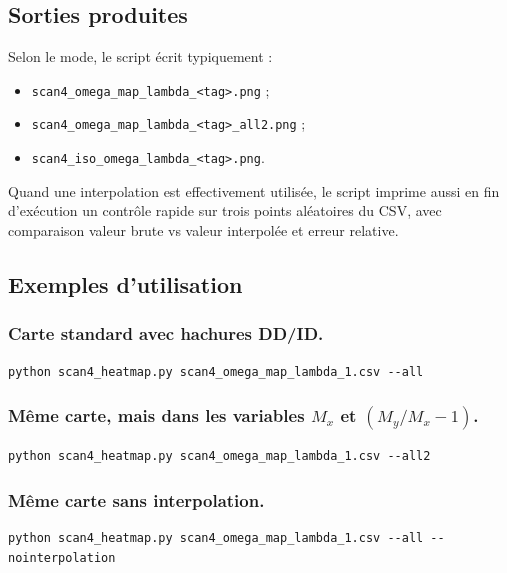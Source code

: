 \documentclass[11pt,a4paper]{article}
\newcommand{\file}[1]{\texttt{#1}}
\begin{document}
\subsection{Sorties produites}

Selon le mode, le script écrit typiquement :
\begin{itemize}[leftmargin=1.4em]
\item \file{scan4\_omega\_map\_lambda\_<tag>.png} ;
\item \file{scan4\_omega\_map\_lambda\_<tag>\_all2.png} ;
\item \file{scan4\_iso\_omega\_lambda\_<tag>.png}.
\end{itemize}

Quand une interpolation est effectivement utilisée, le script imprime aussi en fin d'exécution un contrôle rapide sur trois points aléatoires du CSV, avec comparaison valeur brute vs valeur interpolée et erreur relative.

\subsection{Exemples d'utilisation}

\subsubsection*{Carte standard avec hachures DD/ID.}
\begin{lstlisting}[style=bashstyle]
python scan4_heatmap.py scan4_omega_map_lambda_1.csv --all
\end{lstlisting}

\subsubsection*{Même carte, mais dans les variables \(M_x\) et \((M_y/M_x-1)\).}
\begin{lstlisting}[style=bashstyle]
python scan4_heatmap.py scan4_omega_map_lambda_1.csv --all2
\end{lstlisting}

\subsubsection*{Même carte sans interpolation.}
\begin{lstlisting}[style=bashstyle]
python scan4_heatmap.py scan4_omega_map_lambda_1.csv --all --nointerpolation
\end{lstlisting}
\end{document}
